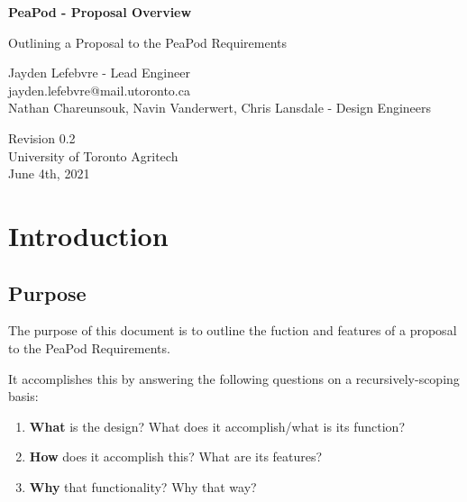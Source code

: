 \documentclass{report}
\begin{document}
\begin{titlepage}
    \begin{center}
        \vspace*{1.2cm}

        \textbf{\large{PeaPod - Proposal Overview}}

        \vspace{0.5cm}

        Outlining a Proposal to the PeaPod Requirements

        \vfill

        Jayden Lefebvre - Lead Engineer\\\small{jayden.lefebvre@mail.utoronto.ca}\\
        \vspace{1cm}
        Nathan Chareunsouk, Navin Vanderwert, Chris Lansdale - Design Engineers

        \vspace{2.5cm}

        Revision 0.2\\
        University of Toronto Agritech\\
        June 4th, 2021

    \end{center}
\end{titlepage}

\thispagestyle{plain}

\tableofcontents
\newpage

\section{Introduction}
\label{sec:intro}

\subsection{Purpose}
\label{sec:purpose}

The purpose of this document is to outline the fuction and features of a proposal to the PeaPod Requirements.

It accomplishes this by answering the following questions on a recursively-scoping basis:
\begin{enumerate}
    \item \textbf{What} is the design? What does it accomplish/what is its function? 
    \item \textbf{How} does it accomplish this? What are its features? 
    \item \textbf{Why} that functionality? Why that way?
\end{enumerate}
\end{document}
